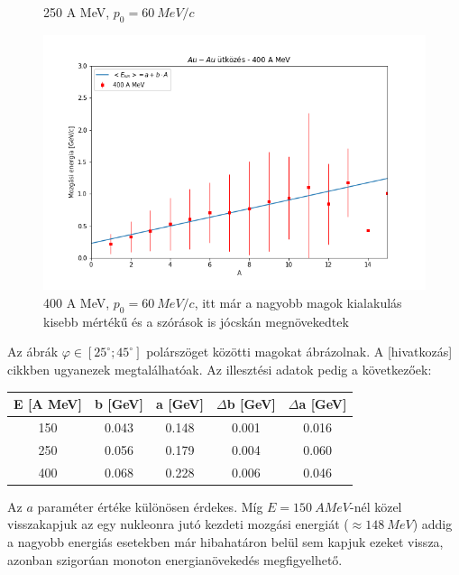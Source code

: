 \documentclass[a4paper,12pt]{article}
\begin{document}
\begin{figure}[H]
\begin{minipage}{.49\textwidth}
    \caption{250 A MeV, $p_{0} = 60 ~MeV/c$}
\end{minipage}
\begin{minipage}[c]{.8\textwidth}
\centering
    \includegraphics[width=\textwidth]{./400AMeV006mom2000adat.png}
    \caption{400 A MeV, $p_{0} = 60 ~MeV/c$, itt már a nagyobb magok kialakulás kisebb mértékű és a szórások is jócskán megnövekedtek}
\end{minipage}
\end{figure}

\par Az ábrák $\varphi \in [25^{\circ}; 45^{\circ}]$ polárszöget közötti magokat ábrázolnak. A [hivatkozás] cikkben ugyanezek megtalálhatóak. Az illesztési adatok pedig a következőek:

\vspace{5mm}

\begin{center}
\begin{tabular}{|c|c|c|c|c|}
\hline
E [A MeV] & b [GeV] & a [GeV] & $\Delta$b [GeV] & $\Delta$a [GeV] \\
\hline
150 & 0.043 & 0.148 & 0.001 & 0.016 \\
\hline
250 & 0.056 & 0.179 & 0.004 & 0.060 \\
\hline
400 & 0.068 & 0.228 & 0.006 & 0.046 \\
\hline
\end{tabular}
\end{center}

\vspace{5mm}

\par Az $a$ paraméter értéke különösen érdekes. Míg $E = 150 ~A MeV$-nél közel visszakapjuk az egy nukleonra jutó kezdeti mozgási energiát ($\approx 148 ~MeV$) addig a nagyobb energiás esetekben már hibahatáron belül sem kapjuk ezeket vissza, azonban szigorúan monoton energianövekedés megfigyelhető. 
 
\end{document}
